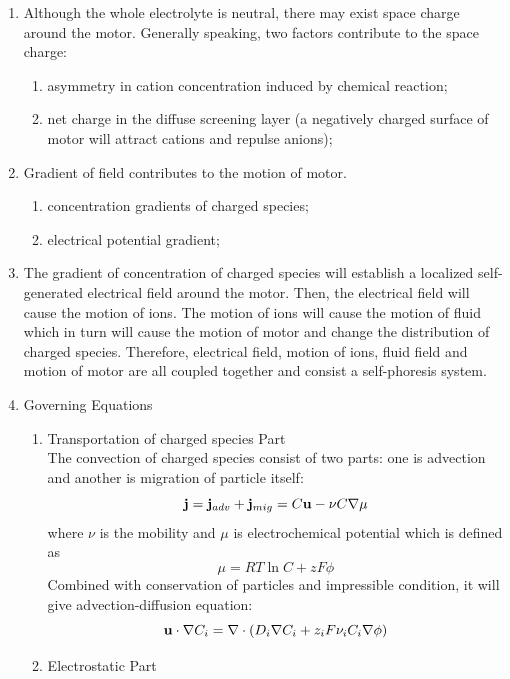 \documentclass[fontsize=11pt, %
                             paper=a4, %
                             twoside, %
                             captions=tableheading,
                             index=totoc,
                             hyperref]{labbook}
\begin{document}
\begin{addmargin}[4cm]{0cm}
\begin{enumerate}
\item
Although the whole electrolyte is neutral, there may exist space charge around the motor. Generally speaking, two factors contribute to the space charge:
\begin{enumerate}
\item
asymmetry in cation concentration induced by chemical reaction;
\item
net charge in the diffuse screening layer (a negatively charged surface of motor will attract cations and repulse anions);
\end{enumerate}
\item Gradient of field contributes to the motion of motor.
\begin{enumerate}
\item
concentration gradients of charged species;
\item
electrical potential gradient;
\end{enumerate}
\item
The gradient of concentration of charged species will establish a localized self-generated electrical field around the motor. Then, the electrical field will cause the motion of ions. The motion of ions will cause the motion of fluid which in turn will cause the motion of motor and change the distribution of charged species. Therefore, electrical field, motion of ions, fluid field and motion of motor are all coupled together and consist a self-phoresis system.
\item Governing Equations
\begin{enumerate}
\item
Transportation of charged species Part\\
The convection of charged species consist of two parts: one is advection and another is migration of particle itself:
\begin{equation}
\mathbf{j}=\mathbf{j}_{adv}+\mathbf{j}_{mig}=C\mathbf{u}-\nu C \nabla \mu
\end{equation}
where $\nu$ is the mobility and $\mu$ is electrochemical potential which is defined as
\begin{equation}
\mu=RT\ln C + z F \phi
\end{equation}
Combined with conservation of particles and impressible condition, it will give advection-diffusion equation:
\begin{equation}
\mathbf{u} \cdot \nabla C_i=\nabla\cdot(D_i \nabla C_i + z_i F \nu_i C_i \nabla \phi)
\end{equation}
\item Electrostatic Part\\

\end{enumerate}
\end{enumerate}
\end{addmargin}
\end{document}

